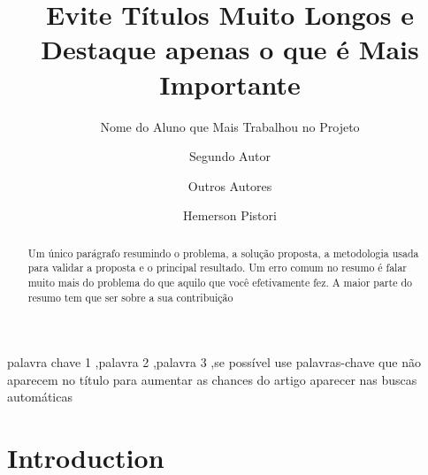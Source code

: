 \documentclass[preprint,10pt,5p]{elsarticle}
\begin{document}
\begin{frontmatter}

\title{Evite Títulos Muito Longos e Destaque apenas o que é Mais Importante}

\address[label1]{Universidade Católica Dom Bosco, Campo Grande, Brazil}
\address[label2]{Universidade Federal de Mato Grosso do Sul, Campo Grande, Brazil}
\address[label3]{Universidade Estadual de Mato Grosso do Sul, Campo Grande, Brazil}

\author[label1]{Nome do Aluno que Mais Trabalhou no Projeto}

\author[label3]{Segundo Autor}

\author[label1]{Outros Autores}

\author[label1,label2]{Hemerson Pistori}


\begin{abstract}
Um único parágrafo resumindo o problema, a solução proposta, a metodologia usada para validar a proposta e o principal resultado. Um erro comum no resumo é falar muito mais do problema do que aquilo que você efetivamente fez. A maior parte do resumo tem que ser sobre a sua contribuição\end{abstract}


\begin{keyword}
palavra chave 1 \sep palavra 2 \sep palavra 3 \sep se possível use palavras-chave que não aparecem no título para aumentar as chances do artigo aparecer nas buscas automáticas

\end{keyword}


\end{frontmatter}







\section{Introduction}
\label{intro}
\end{document}
